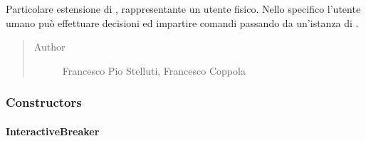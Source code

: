 \documentclass[letterpaper,10pt,italian,openany,oneside]{sphinxmanual}
\begin{document}
\begin{fulllineitems}
\label{\detokenize{source/it/unicam/cs/pa/mastermind/players/InteractiveBreaker:it.unicam.cs.pa.mastermind.players.InteractiveBreaker}}
Particolare estensione di , rappresentante un utente fisico. Nello specifico l’utente umano può effettuare decisioni ed impartire comandi passando da un’istanza di .
\begin{quote}\begin{description}
\item[{Author}] \leavevmode
Francesco Pio Stelluti, Francesco Coppola

\end{description}\end{quote}

\end{fulllineitems}



\subsubsection{Constructors}
\label{\detokenize{source/it/unicam/cs/pa/mastermind/players/InteractiveBreaker:constructors}}

\paragraph{InteractiveBreaker}
\label{\detokenize{source/it/unicam/cs/pa/mastermind/players/InteractiveBreaker:id1}}

\begin{fulllineitems}
\label{\detokenize{source/it/unicam/cs/pa/mastermind/players/InteractiveBreaker:it.unicam.cs.pa.mastermind.players.InteractiveBreaker.InteractiveBreaker(GameView, int)}}
\end{fulllineitems}
\end{document}
